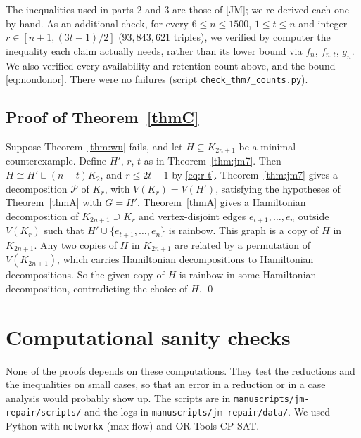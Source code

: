 \documentclass[11pt]{amsart}
\theoremstyle{definition}
\theoremstyle{remark}
\newcommand{\PP}{\mathcal{P}}
\newcommand{\JM}{\textup{[JM]}}
\begin{document}
The inequalities used in parts 2 and 3 are those of \JM; we re-derived each one by hand. As an
additional check, for every $6\le n\le1500$, $1\le t\le n$ and integer $r\in[n+1,(3t-1)/2]$
($93{,}843{,}621$ triples), we verified by computer the inequality each claim actually needs,
rather than its lower bound via $f_n$, $f_{n,t}$, $g_n$. We also verified every availability
and retention count above, and the bound \eqref{eq:nondonor}. There were no failures
(script \texttt{check\_thm7\_counts.py}).

\subsection{Proof of Theorem~\ref{thmC}}
Suppose Theorem~\ref{thm:wu} fails, and let $H\subseteq K_{2n+1}$ be a minimal
counterexample. Define $H'$, $r$, $t$ as in Theorem~\ref{thm:jm7}. Then $H\cong H'\sqcup(n-t)K_2$,
and $r\le 2t-1$ by \eqref{eq:r-t}. Theorem~\ref{thm:jm7} gives a decomposition $\PP$ of
$K_r$, with $V(K_r)=V(H')$, satisfying the hypotheses of Theorem~\ref{thmA} with $G=H'$.
Theorem~\ref{thmA} gives a Hamiltonian decomposition of $K_{2n+1}\supseteq K_r$ and
vertex-disjoint edges $e_{t+1},\dots,e_n$ outside $V(K_r)$ such that
$H'\cup\{e_{t+1},\dots,e_n\}$ is rainbow. This graph is a copy of $H$ in $K_{2n+1}$. Any two
copies of $H$ in $K_{2n+1}$ are related by a permutation of $V(K_{2n+1})$, which carries
Hamiltonian decompositions to Hamiltonian decompositions. So the given copy of $H$ is rainbow
in some Hamiltonian decomposition, contradicting the choice of $H$.
\qed

\section{Computational sanity checks}\label{sec:computations}

None of the proofs depends on these computations. They test the reductions and the
inequalities on small cases, so that an error in a reduction or in a case analysis would
probably show up. The scripts are in \nolinkurl{manuscripts/jm-repair/scripts/} and the logs in
\nolinkurl{manuscripts/jm-repair/data/}. We used Python with \texttt{networkx} (max-flow) and
OR-Tools CP-SAT.
\end{document}

